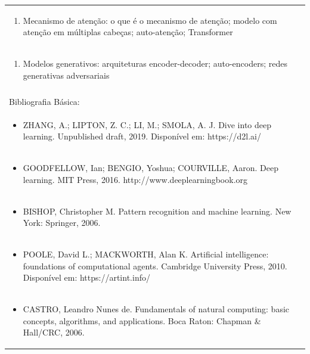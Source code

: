 \documentclass[11pt]{article}
\begin{document}
\begin{center}
\begin{longtable}{|p{4cm}|p{4cm}|p{4cm}|p{4cm}|}
\multicolumn{4}{|p{\dimexpr 16cm + 6\tabcolsep\relax}|}{\begin{enumerate}[start=7]\item Mecanismo de atenção: o que é o mecanismo de atenção; modelo com atenção em múltiplas cabeças; auto-atenção; Transformer\end{enumerate}}\\
\multicolumn{4}{|p{\dimexpr 16cm + 6\tabcolsep\relax}|}{\begin{enumerate}[start=8]\item Modelos generativos: arquiteturas encoder-decoder; auto-encoders; redes generativas adversariais\end{enumerate}}\\
\multicolumn{4}{|p{\dimexpr 16cm + 6\tabcolsep\relax}|}{}\\
\hline
\multicolumn{4}{|p{16cm}|}{Bibliografia Básica:}\\*
\multicolumn{4}{|p{\dimexpr 16cm + 6\tabcolsep\relax}|}{\begin{itemize}\item ZHANG, A.; LIPTON, Z. C.; LI, M.; SMOLA, A. J. Dive into deep learning. Unpublished draft, 2019. Disponível em: https://d2l.ai/\end{itemize}}\\
\multicolumn{4}{|p{\dimexpr 16cm + 6\tabcolsep\relax}|}{\begin{itemize}\item GOODFELLOW, Ian; BENGIO, Yoshua; COURVILLE, Aaron. Deep learning. MIT Press, 2016. http://www.deeplearningbook.org\end{itemize}}\\
\multicolumn{4}{|p{\dimexpr 16cm + 6\tabcolsep\relax}|}{\begin{itemize}\item BISHOP, Christopher M. Pattern recognition and machine learning. New York: Springer, 2006.\end{itemize}}\\
\multicolumn{4}{|p{\dimexpr 16cm + 6\tabcolsep\relax}|}{\begin{itemize}\item POOLE, David L.; MACKWORTH, Alan K. Artificial intelligence: foundations of computational agents. Cambridge University Press, 2010. Disponível em: https://artint.info/\end{itemize}}\\
\multicolumn{4}{|p{\dimexpr 16cm + 6\tabcolsep\relax}|}{\begin{itemize}\item CASTRO, Leandro Nunes de. Fundamentals of natural computing: basic concepts, algorithms, and applications. Boca Raton: Chapman \& Hall/CRC, 2006.\end{itemize}}\\

\end{longtable}
\end{center}
\end{document}
